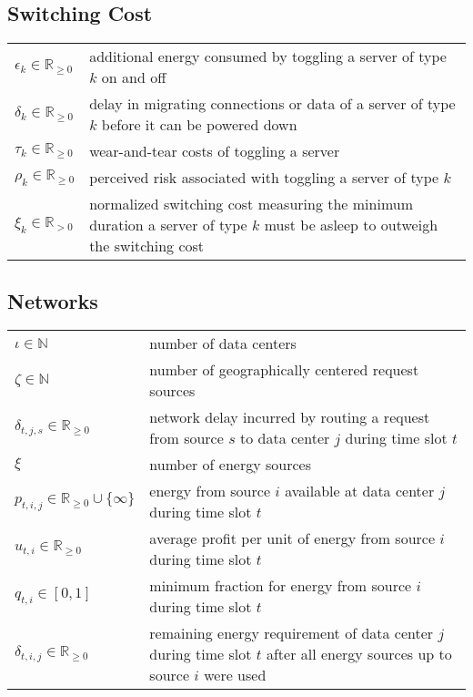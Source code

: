 \subsection*{Switching Cost}

\nopagebreak\begin{tabularx}{\textwidth}{p{100pt}X}
    $\epsilon_k \in \mathbb{R}_{\geq 0}$ & additional energy consumed by toggling a server of type $k$ on and off \\
    $\delta_k \in \mathbb{R}_{\geq 0}$ & delay in migrating connections or data of a server of type $k$ before it can be powered down \\
    $\tau_k \in \mathbb{R}_{\geq 0}$ & wear-and-tear costs of toggling a server \\
    $\rho_k \in \mathbb{R}_{\geq 0}$ & perceived risk associated with toggling a server of type $k$ \\
    $\xi_k \in \mathbb{R}_{>0}$ & normalized switching cost measuring the minimum duration a server of type $k$ must be asleep to outweigh the switching cost \\
\end{tabularx}

\subsection*{Networks}

\nopagebreak\begin{tabularx}{\textwidth}{p{100pt}X}
    $\iota \in \mathbb{N}$ & number of data centers \\
    $\zeta \in \mathbb{N}$ & number of geographically centered request sources \\
    $\delta_{t,j,s} \in \mathbb{R}_{\geq 0}$ & network delay incurred by routing a request from source $s$ to data center $j$ during time slot $t$ \\
    $\xi$ & number of energy sources \\
    $p_{t,i,j} \in \mathbb{R}_{\geq 0} \cup \{\infty\}$ & energy from source $i$ available at data center $j$ during time slot $t$ \\
    $u_{t,i} \in \mathbb{R}_{\geq 0}$ & average profit per unit of energy from source $i$ during time slot $t$ \\
    $q_{t,i} \in [0,1]$ & minimum fraction for energy from source $i$ during time slot $t$ \\
    $\delta_{t,i,j} \in \mathbb{R}_{\geq 0}$ & remaining energy requirement of data center $j$ during time slot $t$ after all energy sources up to source $i$ were used \\
\end{tabularx}

